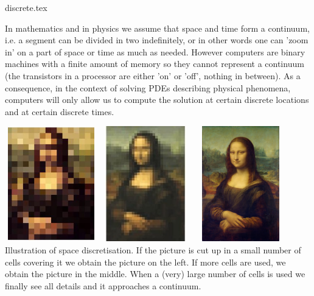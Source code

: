 \begin{flushright} {\tiny {\color{gray} discrete.tex}} \end{flushright}

In mathematics and in physics we assume that space and time form a continuum, i.e.
a segment can be divided in two indefinitely, or in other words one can 'zoom in'
on a part of space or time as much as needed. 
However computers are binary machines with a finite amount of memory so they 
cannot represent a continuum (the transistors in a processor are either 'on' or 'off', 
nothing in between). As a consequence, in the context of solving PDEs
describing physical phenomena, computers will only allow us to compute the solution 
at certain discrete locations and at certain discrete times. 

\begin{center}
\includegraphics[width=4cm,height=5cm]{images/discrete/monalisa1.jpg}
\includegraphics[width=4cm,height=5cm]{images/discrete/monalisa2.jpg}
\includegraphics[width=4cm,height=5cm]{images/discrete/monalisa3.jpg}\\
{\captionfont Illustration of space discretisation. If the picture is cut up 
in a small number of cells covering it we obtain the picture on the left.
If more cells are used, we obtain the picture in the middle. When a (very) large
number of cells is used we finally see all details and it approaches a continuum.}
\end{center}


